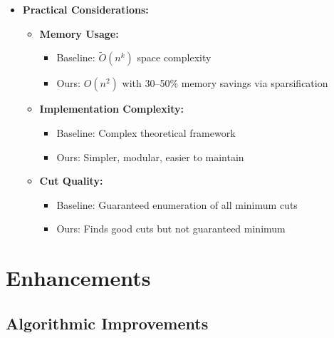 \documentclass[11pt]{article}
\begin{document}
\begin{itemize}
    \item \textbf{Practical Considerations:}
    \begin{itemize}
        \item \textbf{Memory Usage:}
        \begin{itemize}
            \item Baseline: \( \tilde{O}(n^k) \) space complexity
            \item Ours: \( O(n^2) \) with 30--50\% memory savings via sparsification
        \end{itemize}
        \item \textbf{Implementation Complexity:}
        \begin{itemize}
            \item Baseline: Complex theoretical framework
            \item Ours: Simpler, modular, easier to maintain
        \end{itemize}
        \item \textbf{Cut Quality:}
        \begin{itemize}
            \item Baseline: Guaranteed enumeration of all minimum cuts
            \item Ours: Finds good cuts but not guaranteed minimum
        \end{itemize}
    \end{itemize}
\end{itemize}

\section{Enhancements}

\subsection{Algorithmic Improvements}
\end{document}
